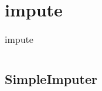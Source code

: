 \chapter{impute\label{impute}}
\begin{table}
    \centering
    \caption{impute}
    \begin{tabular}{l}
        \hline
        \nameref{SimpleImputer} \\
        \hline
    \end{tabular}
\end{table}
\section{SimpleImputer\label{SimpleImputer}}
